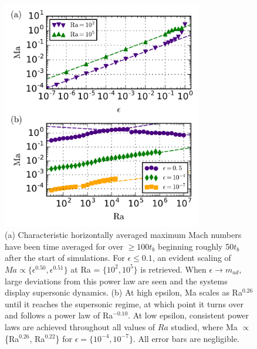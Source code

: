 \documentclass[aps, prl, twocolumn, nofootinbib, groupedaddress, amsfonts, amssymb, amsmath]{revtex4-1}
\begin{document}
\begin{figure}[t]
\includegraphics[width=3.4375in]{./figs/ma_v_eps.png}
\caption{(a) Characteristic horizontally averaged maximum Mach numbers have been
time averaged for over $\geq 100t_{b}$ beginning roughly 50$t_{b}$ after the start of simulations. For $\epsilon \leq 0.1$,
an evident scaling of $Ma \propto \{\epsilon^{0.50}, \epsilon^{0.51}\}$ 
at Ra = $\{10^2, 10^5\}$ is retrieved.
When $\epsilon \rightarrow m_{ad}$, large deviations from this power law are seen and the systems display
supersonic dynamics.  
(b) At high epsilon, Ma scales as Ra$^{0.26}$ until it reaches the supersonic regime, at which point it turns
over and follows a power law of Ra$^{-0.10}$.  At low epsilon, consistent power laws are achieved throughout all
values of $Ra$ studied, where Ma $\propto$ \{Ra$^{0.26}$, Ra$^{0.22}$\} for $\epsilon = \{10^{-4}, 10^{-7}\}$. All
error bars are negligible.  \label{fig:ma_v_eps} }
\end{figure}
\end{document}

